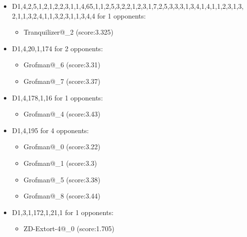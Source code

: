 \begin{appendices}
\begin{itemize}
        \item D1,4,2,5,1,2,1,2,2,3,1,1,4,65,1,1,2,5,3,2,2,1,2,3,1,7,2,5,3,3,3,1,3,4,1,4,1,1,2,3,1,3,2,1,1,3,2,4,1,1,3,2,3,1,1,3,4,4 for 1 opponents:
        \begin{multicols}{3}
            \begin{itemize}
                \item Tranquilizer@\_2 (score:3.325)
            \end{itemize}
        \end{multicols}

        \item D1,4,20,1,174 for 2 opponents:
        \begin{multicols}{3}
            \begin{itemize}
                \item Grofman@\_6 (score:3.31)
                \item Grofman@\_7 (score:3.37)
            \end{itemize}
        \end{multicols}

        \item D1,4,178,1,16 for 1 opponents:
        \begin{multicols}{3}
            \begin{itemize}
                \item Grofman@\_4 (score:3.43)
            \end{itemize}
        \end{multicols}

        \item D1,4,195 for 4 opponents:
        \begin{multicols}{3}
            \begin{itemize}
                \item Grofman@\_0 (score:3.22)
                \item Grofman@\_1 (score:3.3)
                \item Grofman@\_5 (score:3.38)
                \item Grofman@\_8 (score:3.44)
            \end{itemize}
        \end{multicols}

        \item D1,3,1,172,1,21,1 for 1 opponents:
        \begin{multicols}{3}
            \begin{itemize}
                \item ZD-Extort-4@\_0 (score:1.705)
            \end{itemize}
        \end{multicols}


\end{itemize}
\end{appendices}
